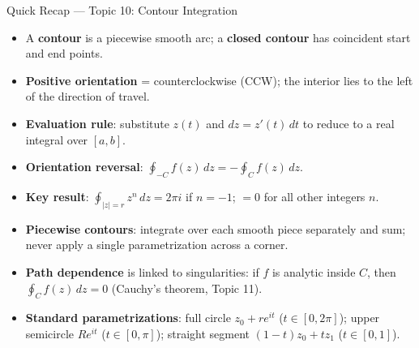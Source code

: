 \documentclass[12pt,a4paper]{article}
\begin{document}
\begin{learnbox}{Quick Recap --- Topic 10: Contour Integration}
\begin{itemize}[leftmargin=1.5em]
  \item A \textbf{contour} is a piecewise smooth arc; a \textbf{closed contour}
        has coincident start and end points.
  \item \textbf{Positive orientation} = counterclockwise (CCW); the interior
        lies to the left of the direction of travel.
  \item \textbf{Evaluation rule}: substitute $z(t)$ and $dz=z'(t)\,dt$ to reduce
        to a real integral over $[a,b]$.
  \item \textbf{Orientation reversal}: $\oint_{-C} f(z)\,dz = -\oint_C f(z)\,dz$.
  \item \textbf{Key result}: $\oint_{|z|=r} z^n\,dz = 2\pi i$ if $n=-1$;
        $= 0$ for all other integers $n$.
  \item \textbf{Piecewise contours}: integrate over each smooth piece separately
        and sum; never apply a single parametrization across a corner.
  \item \textbf{Path dependence} is linked to singularities: if $f$ is analytic
        inside $C$, then $\oint_C f(z)\,dz = 0$ (Cauchy's theorem, Topic 11).
  \item \textbf{Standard parametrizations}: full circle $z_0+re^{it}$
        ($t\in[0,2\pi]$); upper semicircle $Re^{it}$ ($t\in[0,\pi]$);
        straight segment $(1-t)z_0+tz_1$ ($t\in[0,1]$).
\end{itemize}
\end{learnbox}
\end{document}
